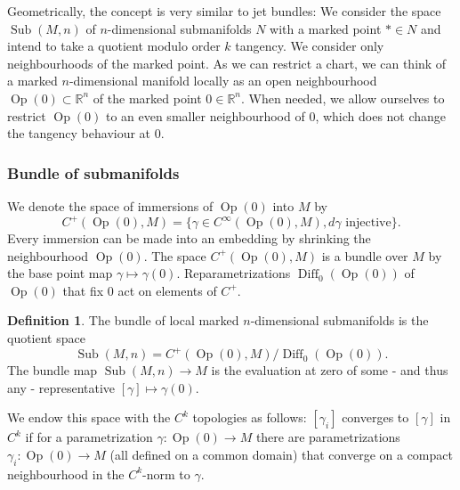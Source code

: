 \documentclass{amsart}
\newcommand{\RR}{\mathbb{R}}
\newcommand{\Diff}{\operatorname{Diff}}
\newcommand{\sub}{\operatorname{Sub}}
\newcommand{\Sub}{\operatorname{Sub}}
\newcommand{\Op}{\operatorname{Op}}
\theoremstyle{definition}
\newtheorem{definition}[proposition]{Definition}
\theoremstyle{remark}
\numberwithin{equation}{section}
\begin{document}
Geometrically, the concept is very similar to jet bundles: We consider the space $\Sub(M,n)$  of $n$-dimensional submanifolds $N$ with a marked point $*\in N$ and intend to take a quotient modulo order $k$ tangency. We consider only neighbourhoods of the marked point. As we can restrict a chart, we can think of a marked $n$-dimensional manifold locally as an open neighbourhood $\Op(0)\subset \RR^n$ of the marked point $0\in \RR^n$. When needed, we allow ourselves to restrict $\Op(0)$ to an even smaller neighbourhood of $0$, which does not change the tangency behaviour at 0.  

\subsubsection{Bundle of submanifolds}
We denote the space of immersions of $\Op(0)$ into $M$ by
$$C^+(\Op(0),M)=\{\gamma\in C^\infty (\Op(0), M), d\gamma \mbox{ injective}\}.$$
Every immersion can be made into an embedding by shrinking the neighbourhood $\Op(0)$. The space $C^+(\Op(0),M)$ is a bundle over $M$ by the base point map $\gamma\mapsto\gamma(0)$. Reparametrizations $\Diff_0(\Op(0))$ of $\Op(0)$ that fix $0$ act on elements of $C^+$. 
\begin{definition}
    The bundle of local marked $n$-dimensional submanifolds is the quotient space
    $$\sub(M,n)=C^+(\Op(0),M)/\Diff_0(\Op(0)).$$
    The bundle map $\sub(M,n)\to M$ is the evaluation at zero of some - and thus any - representative $[\gamma]\mapsto \gamma(0)$. 
\end{definition}
We endow this space with the $C^k$ topologies as follows: $[\gamma_i]$ converges to $[\gamma]$ in $C^k$ if for a parametrization $\gamma:\Op(0)\to M$ there are parametrizations $\gamma_i:\Op(0)\to M$ (all defined on a common domain) that converge on a compact neighbourhood in the $C^k$-norm to $\gamma$. 
\end{document}
